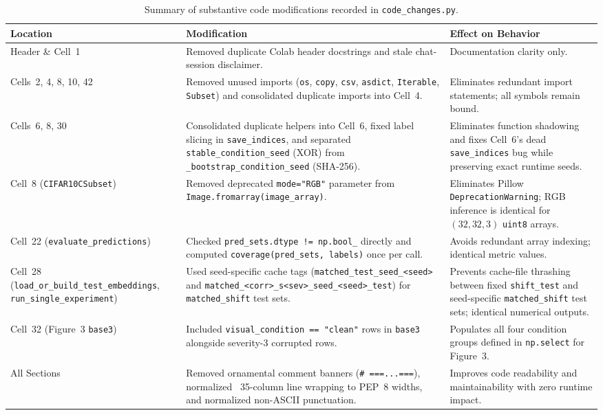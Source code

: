 \documentclass[11pt,a4paper]{article}
\begin{document}
\begin{table}[!htbp]
\centering
\caption{Summary of substantive code modifications recorded in \texttt{code\_\allowbreak{}changes.py}.}
\label{tab:changes_summary}
\small\begin{tabularx}{\textwidth}{P{0.22\textwidth} Y Y}
\toprule
\textbf{Location} & \textbf{Modification} & \textbf{Effect on Behavior} \\
\midrule
Header \& Cell~1 & Removed duplicate Colab header docstrings and stale chat-session disclaimer. & Documentation clarity only. \\
Cells~2, 4, 8, 10, 42 & Removed unused imports (\texttt{os}, \texttt{copy}, \texttt{csv}, \texttt{asdict}, \texttt{Iterable}, \texttt{Subset}) and consolidated duplicate imports into Cell~4. & Eliminates redundant import statements; all symbols remain bound. \\
Cells~6, 8, 30 & Consolidated duplicate helpers into Cell~6, fixed label slicing in \texttt{save\_\allowbreak{}indices}, and separated \texttt{stable\_\allowbreak{}condition\_\allowbreak{}seed} (XOR) from \texttt{\_\allowbreak{}bootstrap\_\allowbreak{}condition\_\allowbreak{}seed} (SHA-256). & Eliminates function shadowing and fixes Cell~6's dead \texttt{save\_\allowbreak{}indices} bug while preserving exact runtime seeds. \\
Cell~8 (\texttt{CIFAR10CSubset}) & Removed deprecated \texttt{mode="RGB"} parameter from \texttt{Image.fromarray(image\_\allowbreak{}array)}. & Eliminates Pillow \texttt{DeprecationWarning}; RGB inference is identical for $(32, 32, 3)$ \texttt{uint8} arrays. \\
Cell~22 (\texttt{evaluate\_\allowbreak{}predictions}) & Checked \texttt{pred\_\allowbreak{}sets.dtype != np.bool\_\allowbreak{}} directly and computed \texttt{coverage(pred\_\allowbreak{}sets, labels)} once per call. & Avoids redundant array indexing; identical metric values. \\
Cell~28 (\texttt{load\_\allowbreak{}or\_\allowbreak{}build\_\allowbreak{}test\_\allowbreak{}embeddings}, \texttt{run\_\allowbreak{}single\_\allowbreak{}experiment}) & Used seed-specific cache tags (\texttt{matched\_\allowbreak{}test\_\allowbreak{}seed\_\allowbreak{}<seed>} and \texttt{matched\_\allowbreak{}<corr>\_\allowbreak{}s<sev>\_\allowbreak{}seed\_\allowbreak{}<seed>\_\allowbreak{}test}) for \texttt{matched\_\allowbreak{}shift} test sets. & Prevents cache-file thrashing between fixed \texttt{shift\_\allowbreak{}test} and seed-specific \texttt{matched\_\allowbreak{}shift} test sets; identical numerical outputs. \\
Cell~32 (Figure~3 \texttt{base3}) & Included \texttt{visual\_\allowbreak{}condition == "clean"} rows in \texttt{base3} alongside severity-3 corrupted rows. & Populates all four condition groups defined in \texttt{np.select} for Figure~3. \\
All Sections & Removed ornamental comment banners (\texttt{\# ===...===}), normalized ~35-column line wrapping to PEP~8 widths, and normalized non-ASCII punctuation. & Improves code readability and maintainability with zero runtime impact. \\
\bottomrule
\end{tabularx}
\end{table}
\end{document}
